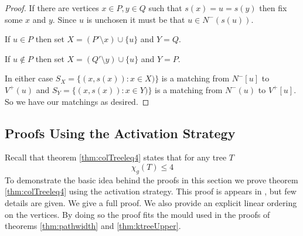 \begin{proof}
    If there are vertices $x\in P, y\in Q$ such that $s(x)=u=s(y)$ then fix some $x$ and $y$. Since $u$ is unchosen it must be that $u \in N^-(s(u))$. 
    
    If $u\in P$ then set $X = (P'\setminus x) \cup\{u\}$ and $Y= Q$. 
    
    If $u\notin P$ then set $X = (Q'\setminus y) \cup\{u\}$ and $Y= P$.
    
    In either case $S_X= \{(x,s(x)):x\in X)\}$ is a matching from $N^-[u]$ to $V^+(u)$ and $S_Y= \{(x,s(x)):x\in Y)\}$ is a matching from $N^-(u)$ to $V^+[u]$. So we have our matchings as desired.
\end{proof}


\subsection{Proofs Using the Activation Strategy} \label{sec:actvStratProofs}
Recall that theorem \ref{thm:colTreeleq4} states that for any tree $T$ \[\chi_g(T)\leq 4\]
To demonstrate the basic idea behind the proofs in this section we prove theorem \ref{thm:colTreeleq4} using the activation strategy. This proof is appears in \cite{KIERSTEAD2000}, but few details are given. We give a full proof. We also provide an explicit linear ordering on the vertices. By doing so the proof fits the mould used in the proofs of theorems \ref{thm:pathwidth} and \ref{thm:ktreeUpper}. 

